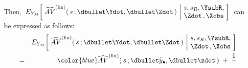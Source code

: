 \begin{lemma}
\begin{enumerate}
\begin{eqnarray*}
    \end{eqnarray*}
    Then,
    \,$
    E_{Y_{M}}\!\left[\;
        \widehat{AV}^{\textnormal{(lin)}}(\,s\,;\dbullet\Ydot,\dbullet\Zdot\,)
        \,\left\vert\!
        \begin{array}{c} s,s_{R},\YsubR, \\ \Zdot\,,\Xobs \end{array}
        \right.
        \!\!\right]
    $\,
    can be expressed as follows:
    \begin{eqnarray*}
    &&
        E_{Y_{M}}\!\left[\;
            \widehat{AV}^{\textnormal{(lin)}}(\,s\,;\dbullet\Ydot,\dbullet\Zdot\,)
            \,\left\vert\!
            \begin{array}{c} s,s_{R},\YsubR, \\ \Zdot\,,\Xobs \end{array}
            \right.
            \!\!\right]
    \\
    & = &
        {\color{blue}
        \widehat{AV}^{\textnormal{(lin)}}(\,s\,;\dbullet\widetilde{y}_{\bullet},\dbullet\zdot\,)
        \; + \;
        \dfrac{
            1
            }{
}}
\end{eqnarray*}
\end{enumerate}
\end{lemma}
